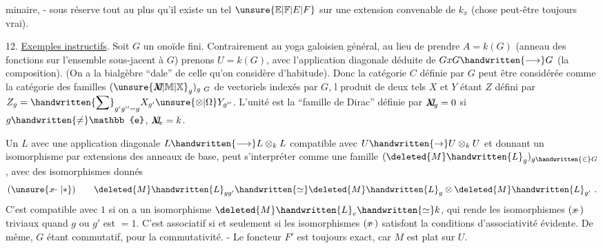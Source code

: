 %
minaire, - sous réserve tout au plus qu'il existe un tel $\unsure{\mathbb{E}|\mathbb{F}|E|F}$ sur une extension convenable de $k_x$ (chose peut-être toujours vrai).

12. \uline{Exemples instructifs}. Soit $G$ un onoïde fini. Contrairement au yoga galoisien général, au lieu de prendre $A=k(G)$ (anneau des fonctions sur l'ensemble sous-jacent à $G$) prenons $U=k(G)$, avec l'application diagonale déduite de $GxG\handwritten{\longrightarrow}G$ (la composition). (On a la bialgèbre ``dale'' de celle qu'on considère d'habitude). Donc la catégorie $C$ définie par $G$  peut être considérée comme la catégorie des familles $(\unsure{\rlap{\(M\)}X|\mathbb M|\mathbb X}_g)_{g\ G}$ de vectoriels indexés par $G$, l produit de deux tels $X$ et $Y$ étant $Z$ défini par $Z_g=\handwritten{\displaystyle\sum}_{g'g''=g}X_{g'}\unsure{\otimes|\Omega} Y_{g''}$. L'unité est la ``famille de Dirac'' définie par $\rlap{\(M\)}X_g=0$ si $g\handwritten{\ne}\mathbb{e}$, $\rlap{\(M\)}X_e=k$.

Un $L$ avec une application diagonale $L\handwritten{\longrightarrow}L\otimes_k L$ compatible avec $U\handwritten{\to}U\otimes_k U$ et donnant un isomorphisme par extensions des anneaux de base, peut s'interpréter comme une famille $(\deleted{M}\handwritten{L}_g)_{g\handwritten{\in}G}$, avec des isomorphismes donnés
\[
(\unsure{\rlap{\(x\)}-|*})\qquad \deleted{M}\handwritten{L}_{gg'}\handwritten{\simeq}\deleted{M}\handwritten{L}_g\otimes\deleted{M}\handwritten{L}_{g'}\ .
\]
C'est compatible avec $1$ si on a un isomorphisme\inserted{\handwritten{\unsure{(*+)|(**)}}} $\deleted{M}\handwritten{L}_e\handwritten{\simeq}k$, qui rende les isomorphismes $(\rlap{\(x\)}-)$ triviaux quand  $g$ ou $g'$ est $=1$. C'est associatif si et seulement si les isomorphismes $(\rlap{\(x\)}-)$ satisfont la  conditions d'associativité évidente. De même, $G$ étant commutatif, pour la commutativité. - Le foncteur $F'$ est toujours exact, car $M$ est plat sur $U$.

